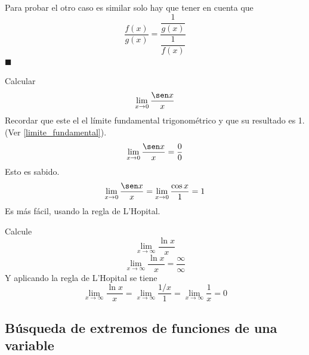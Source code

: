\documentclass[10pt,twoside]{SelfArx} %
\begin{document}
   Para probar el otro caso es similar solo hay que tener en cuenta que 
   \begin{equation}
   \dfrac{f(x)}{g(x)}=\dfrac{\dfrac{1}{g(x)}}{\dfrac{1}{f(x)}}
   \end{equation}
   $ \blacksquare $
   \begin{ejemplo}
   	Calcular\\
   	\begin{equation}
   	\lim\limits_{x\rightarrow0}\dfrac{\sen x}{x}
   	\end{equation}
   	Recordar que este el el l\'imite fundamental trigonom\'etrico y que su resultado es 1.(Ver \ref{limite_fundamental}).
   	\begin{equation}
   	\lim\limits_{x\rightarrow0}\dfrac{\sen x}{x}=\dfrac{0}{0}
   	\end{equation}
   	Esto es sabido.
   	\begin{equation}
   	\lim\limits_{x\rightarrow0}\dfrac{\sen x}{x}=\lim\limits_{x\rightarrow0}\dfrac{\cos x}{1}=1
   	\end{equation}
   	Es m\'as f\'acil, usando la regla de L'Hopital.
   \end{ejemplo}
   \begin{ejemplo}
   	Calcule\\
\[    	\lim\limits_{x\rightarrow\infty}\dfrac{\ln x}{x} \]
\begin{equation}
\lim\limits_{x\rightarrow\infty}\dfrac{\ln x}{x}=\dfrac{\infty}{\infty}
\end{equation}
Y aplicando la regla de L'Hopital se tiene
\begin{equation}
\lim\limits_{x\rightarrow\infty}\dfrac{\ln x}{x}=\lim\limits_{x\rightarrow\infty}\dfrac{1/x}{1}=\lim\limits_{x\rightarrow\infty}\dfrac{1}{x}=0
\end{equation}
   \end{ejemplo}
   
   
   
   
   
   
   
   
  \subsection{B\'usqueda de extremos de funciones de una variable}
  
\end{document}
